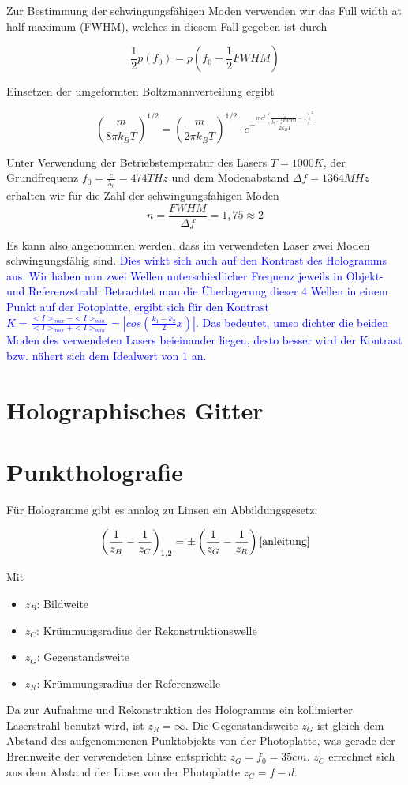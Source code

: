 \documentclass[bigchapter,colorback,accentcolor=tud4b,linedtoc,11pt]{tudreport}
\begin{document}
Zur Bestimmung der schwingungsfähigen Moden verwenden wir das Full width at half
maximum (FWHM), welches in diesem Fall gegeben ist durch 

$$\frac{1}{2}p(f_0) = p(f_0 - \frac{1}{2} FWHM) $$

Einsetzen der umgeformten Boltzmannverteilung ergibt

$$\left(\frac{m}{8\pi k_B T}\right)^{1/2} = \left(\frac{m}{2\pi k_B
    T}\right)^{1/2} \cdot e^{-\frac{m c^2\left( \frac{f_0}{f_0 -
        \frac{1}{2}FWHM}-1 \right)^2}{2k_B T}}$$

Unter Verwendung der Betriebstemperatur des Lasers $T = 1000K$, der
Grundfrequenz $f_0 = \frac{c}{\lambda_0} = 474THz$ und dem Modenabstand $\Delta
f = 1364MHz$ erhalten wir für die Zahl der schwingungsfähigen Moden
$$n = \frac{FWHM}{\Delta f} = 1,75 \approx 2$$

Es kann also angenommen werden, dass im verwendeten Laser zwei Moden
schwingungsfähig sind. \textcolor{blue}{Dies wirkt sich auch auf den Kontrast des Hologramms aus. Wir haben nun zwei Wellen unterschiedlicher Frequenz jeweils in Objekt- und Referenzstrahl. Betrachtet man die Überlagerung dieser 4 Wellen in einem Punkt auf der Fotoplatte, ergibt sich für den Kontrast $K = \frac{<I>_{max}-<I>_{min}}{<I>_{max}+<I>_{min}} = |cos \left( \frac{k_1-k_2}{2} x \right)|$. Das bedeutet, umso dichter die beiden Moden des verwendeten Lasers beieinander liegen, desto besser wird der Kontrast bzw. nähert sich dem Idealwert von 1 an.}

\section{Holographisches Gitter}

\section{Punktholografie}

Für Hologramme gibt es analog zu Linsen ein Abbildungsgesetz:

$$\left( \frac{1}{z_B} -\frac{1}{z_C} \right)_{1,2} = \pm \left( \frac{1}{z_G}
  -\frac{1}{z_R} \right) \cite{anleitung}$$

Mit 
\begin{itemize}
  \item $z_B$: Bildweite
  \item $z_C$: Krümmungsradius der Rekonstruktionswelle
  \item $z_G$: Gegenstandsweite
  \item $z_R$: Krümmungsradius der Referenzwelle
\end{itemize}
Da zur Aufnahme und Rekonstruktion des Hologramms ein kollimierter Laserstrahl
benutzt wird, ist $z_R = \infty$. Die Gegenstandsweite $z_G$ ist gleich dem
Abstand des aufgenommenen Punktobjekts von der Photoplatte, was gerade der
Brennweite der verwendeten Linse entspricht: $z_G = f_0 = 35cm$. $z_C$ errechnet
sich aus dem Abstand der Linse von der Photoplatte $z_C = f - d$.
\end{document}
